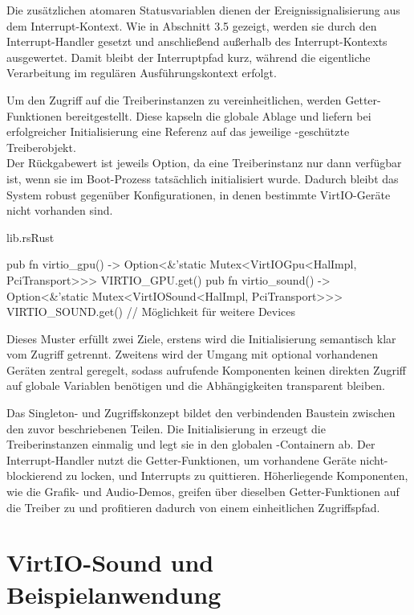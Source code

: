 Die zusätzlichen atomaren Statusvariablen dienen der Ereignissignalisierung aus dem Interrupt-Kontext. Wie in Abschnitt 3.5 gezeigt, werden sie durch den Interrupt-Handler gesetzt und anschließend außerhalb des Interrupt-Kontexts ausgewertet. Damit bleibt der Interruptpfad kurz, während die eigentliche Verarbeitung im regulären Ausführungskontext erfolgt.

Um den Zugriff auf die Treiberinstanzen zu vereinheitlichen, werden Getter-Funktionen bereitgestellt. Diese kapseln die globale Ablage und liefern bei erfolgreicher Initialisierung eine Referenz auf das jeweilige -geschützte Treiberobjekt.\\
Der Rückgabewert ist jeweils Option, da eine Treiberinstanz nur dann verfügbar ist, wenn sie im Boot-Prozess tatsächlich initialisiert wurde. Dadurch bleibt das System robust gegenüber Konfigurationen, in denen bestimmte VirtIO-Geräte nicht vorhanden sind.

\begin{codeblock}{lib.rs}{Rust}
  \begin{rustcode}
pub fn virtio_gpu() -> Option<&'static Mutex<VirtIOGpu<HalImpl, PciTransport>>> {
    VIRTIO_GPU.get()
}
pub fn virtio_sound() -> Option<&'static Mutex<VirtIOSound<HalImpl, PciTransport>>> {
    VIRTIO_SOUND.get()
}
// Möglichkeit für weitere Devices
  \end{rustcode}
\end{codeblock}

Dieses Muster erfüllt zwei Ziele, erstens wird die Initialisierung semantisch klar vom Zugriff getrennt. Zweitens wird der Umgang mit optional vorhandenen Geräten zentral geregelt, sodass aufrufende Komponenten keinen direkten Zugriff auf globale Variablen benötigen und die Abhängigkeiten transparent bleiben.

Das Singleton- und Zugriffskonzept bildet den verbindenden Baustein zwischen den zuvor beschriebenen Teilen. Die Initialisierung in  erzeugt die Treiberinstanzen einmalig und legt sie in den globalen -Containern ab. Der Interrupt-Handler nutzt die Getter-Funktionen, um vorhandene Geräte nicht-blockierend zu locken, und Interrupts zu quittieren. Höherliegende Komponenten, wie die Grafik- und Audio-Demos, greifen über dieselben Getter-Funktionen auf die Treiber zu und profitieren dadurch von einem einheitlichen Zugriffspfad.

\section{VirtIO-Sound und Beispielanwendung}

